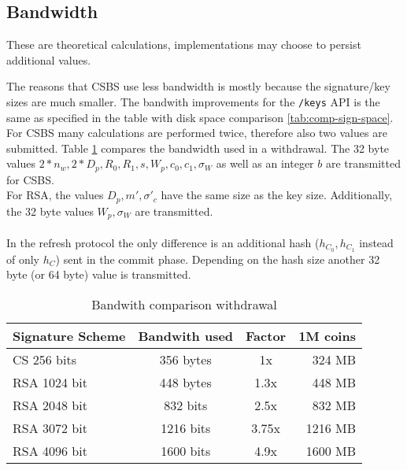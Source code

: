 \subsection{Bandwidth}
\begin{bfhWarnBox}
    These are theoretical calculations, implementations may choose to persist additional values.
\end{bfhWarnBox}
The reasons that \gls{CSBS} use less bandwidth is mostly because the signature/key sizes are much smaller.
The bandwith improvements for the \texttt{/keys} API is the same as specified in the table with disk space comparison \ref{tab:comp-sign-space}.
For \gls{CSBS} many calculations are performed twice, therefore also two values are submitted.
Table \ref{tab:comp-band-withd} compares the bandwidth used in a withdrawal.
The 32 byte values $2 * n_w, 2 * D_p, R_0, R_1, s,W_p, c_0, c_1, \sigma_W$ as well as an integer $b$ are transmitted for \gls{CSBS}.\\
For RSA, the values $D_p, m', \sigma'_c$ have the same size as the key size.
Additionally, the 32 byte values $W_p, \sigma_W$ are transmitted.
\\\\
In the refresh protocol the only difference is an additional hash ($h_{C_0}, h_{C_1}$ instead of only $h_C$) sent in the commit phase.
Depending on the hash size another 32 byte (or 64 byte) value is transmitted.

\begin{table}[ht]
    \centering
    \setupBfhTabular
    \begin{tabular}{lccr}
        \rowcolor{BFH-tablehead}
        \textbf{Signature Scheme} & \textbf{Bandwith used} & \textbf{Factor} & \textbf{1M coins}\\\hline
        CS 256 bits & 356 bytes & 1x & 324 MB\\\hline
        RSA 1024 bit & 448 bytes & 1.3x & 448 MB \\\hline
        RSA 2048 bit & 832 bits & 2.5x & 832 MB\\\hline
        RSA 3072 bit & 1216 bits & 3.75x & 1216 MB\\\hline
        RSA 4096 bit & 1600 bits & 4.9x & 1600 MB\\\hline
    \end{tabular}
    \caption{Bandwith comparison withdrawal}
    \label{tab:comp-band-withd}
\end{table}

